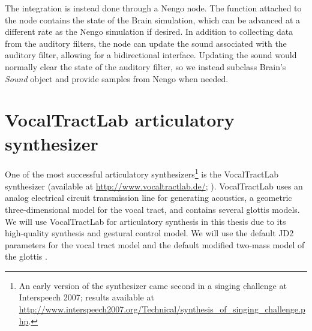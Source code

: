 The integration is instead done
through a Nengo node.
The function attached to the node
contains the state of the Brain simulation,
which can be advanced at a different rate
as the Nengo simulation if desired.
In addition to collecting
data from the auditory filters,
the node can update the
sound associated with
the auditory filter,
allowing for a bidirectional interface.
Updating the sound would normally
clear the state of the auditory filter,
so we instead subclass Brain's
\textit{Sound} object
and provide samples from
Nengo when needed.

\section{VocalTractLab articulatory synthesizer}
\label{sec:vtl}

One of the most successful articulatory
synthesizers\footnote{An early version of the synthesizer
  came second in a singing challenge
  at Interspeech 2007; results available at
  \url{http://www.interspeech2007.org/Technical/synthesis_of_singing_challenge.php}.}
is the VocalTractLab synthesizer
(available at \url{http://www.vocaltractlab.de/};
\citealp{birkholz2013}).
VocalTractLab uses
an analog electrical circuit transmission line
for generating acoustics,
a geometric three-dimensional model for the vocal tract,
and contains several glottis models.
We will use VocalTractLab
for articulatory synthesis
in this thesis
due to its high-quality synthesis
and gestural control model.
We will use the default JD2 parameters
for the vocal tract model
and the default modified two-mass model
of the glottis \citep{birkholz2011}.
